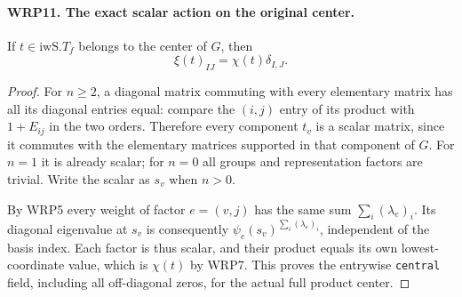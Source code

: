\documentclass[11pt,a4paper]{article}
\numberwithin{equation}{section}
\theoremstyle{remark}\newtheorem{remark}[theorem]{Remark}
\begin{document}
\paragraph{WRP11. The exact scalar action on the original center.}
\label{claim:WRP11}
If $t\in\mathrm{iwS}.T_f$ belongs to the center of $G$,
then
\[
                 \xi(t)_{IJ}=\chi(t)\delta_{I,\allowbreak{} J}.
\]
\begin{proof}
For $n\geq2$, a diagonal matrix commuting with every
elementary matrix has all its diagonal entries equal:
compare the $(i,\allowbreak{} j)$ entry of its product with
$1+E_{ij}$ in the two orders.  Therefore every component
$t_v$ is a scalar matrix, since it commutes with the
elementary matrices supported in that component of $G$.
For $n=1$ it is already scalar; for $n=0$ all groups
and representation factors are trivial.  Write the
scalar as $s_v$ when $n>0$.

By WRP5 every weight of factor $e=(v,\allowbreak{} j)$ has the same
sum $\sum_i(\lambda_e)_i$.  Its diagonal eigenvalue
at $s_v$ is consequently
$\psi_e(s_v)^{\sum_i(\lambda_e)_i}$, independent of
the basis index.  Each factor is thus scalar, and
their product equals its own lowest-coordinate value,
which is $\chi(t)$ by WRP7.  This proves the entrywise
\texttt{central} field, including all off-diagonal
zeros, for the actual full product center.
\end{proof}

\end{document}
